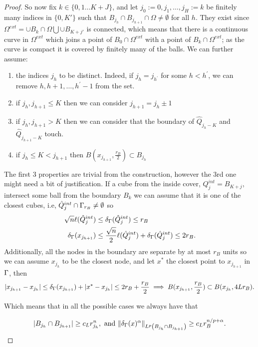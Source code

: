 \begin{proof}

So now fix $k\in \{0,1\ldots K+J\}$, and let $j_0:=0, j_1, \ldots, j_H:=k$ be finitely many indices in $\{0, K'\}$ such that $B_{j_h} \cap B_{j_{h+1}} \cap \Omega \neq \emptyset$ for all $h$. They exist since $\Omega^{ext}=\cup B_k\cap \Omega\bigcup\cup B_{K+j'}$ is connected, which means that there is a continuous curve in $\Omega^{ext}$ which joins a point of $B_0\cap\Omega ^{ext}$ with a point of $B_k\cap\Omega ^{ext}$; as the curve is compact it is covered by finitely many of the balls. We can further assume:
\begin{enumerate}
    \item the indices $j_h$ to be distinct. Indeed, if $j_h=j_{h^{\prime}}$ for some $h<h^{\prime}$, we can remove $h, h+1, \ldots, h^{\prime}-1$ from the set.
    \item if $j_h,j_{h+1}\leq K$ then we can consider $j_{h+1}=j_h\pm 1$
    \item if $j_h,j_{h+1} > K$ then we can consider that the boundary of $\hat{Q}_{j_h-K}$ and $\hat{Q}_{j_{h+1}-K}$ touch.
    \item if $j_h\leq K< j_{h+1}$ then $B(x_{j_{h+1}},\frac{r_B}{2})\subset B_{j_h}$
\end{enumerate} 

The first 3 properties are trivial from the construction, however the 3rd one might need a bit of justification. If a cube from the inside cover,  $Q^{int}_j=B_{K+j}$, intersect some ball from the boundary $B_k$ we can assume that it is one of the closest cubes, i.e,   $\hat{Q}^{int}_{j}\cap \Gamma_{r_B}\neq \emptyset$ so 
\begin{align*}
    \sqrt{n}\ell(\hat{Q}^{int}_{j})&\leq\delta_\Gamma(\hat{Q}^{int}_{j})\leq r_B \\
    \delta_\Gamma(x_{j_{h+1}})&\leq \frac{\sqrt{n}}{2}\ell(\hat{Q}^{int}_{j})+ \delta_\Gamma(\hat{Q}^{int}_{j})\leq 2 r_B.  
\end{align*}
Additionally, all the nodes in the boundary are separate by at most $r_B$ units so we can assume $x_{j_h}$ to be the closest node, and let $x^*$ the closest point to $x_{j_{h+1}}$ in $\Gamma$, then
$$|x_{j_{h+1}}-x_{j_{h}}|\leq  \delta_\Gamma(x_{j_{h+1}}) + |x^*-x_{j_{h}}| \leq 2 r_B+ \frac{r_B}{2}\implies B(x_{j_{h+1}},\frac{r_B}{2}) \subset B(x_{j_{h}},4Lr_B).$$


Which means that in all the possible cases we always have that

$$|B_{j_h}\cap B_{j_{h+1}}|\geq c_L r^n_{j_{h}},\text{   and   }  \|\delta_\Gamma(x)^\alpha\|_{L^p \left(B_{j_h}\cap B_{j_{h+1}}\right)}\geq c_L r_B^{n/p+\alpha } .$$


\end{proof}
